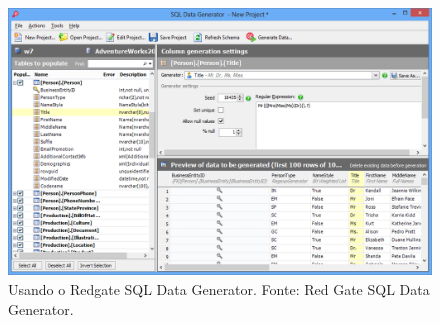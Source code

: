 \documentclass[
	12pt,				%
	openright,			%
	twoside,			%
	a4paper,			%
	english,			%
	brazil				%
	]{abntex2}
\begin{document}
		\begin{figure}[h]
			\centering
			\includegraphics[width=\linewidth]{./figures/TrabalhosRelacionados/sql-data-generator.png}
			\caption{Usando o Redgate SQL Data Generator. Fonte: Red Gate SQL Data Generator.}
			\label{fig:RedgateSQLDG}
		\end{figure}
\end{document}
